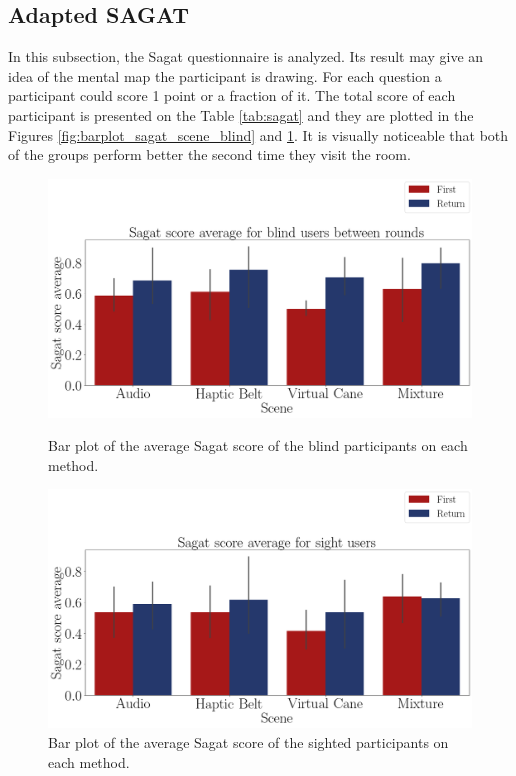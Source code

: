 \subsection{Adapted SAGAT}
\label{subsec:results_adapted_sagat}

In this subsection, the Sagat questionnaire is analyzed. Its result may give an idea of the mental map the participant is drawing. For each question a participant could score 1 point or a fraction of it. The total score of each participant is presented on the Table \ref{tab:sagat} and they are plotted in the Figures \ref{fig:barplot_sagat_scene_blind} and \ref{fig:barplot_sagat_scene_sight}. It is visually noticeable that both of the groups perform better the second time they visit the room.



\begin{figure}[!htb]
    \centering
    \begin{minipage}{\textwidth}
        \centering
        \includegraphics[width = 0.8\linewidth]{Resultados/Sagat/Figuras/png/barplot_sagat_avg_scene_blind.png}
        \caption{Bar plot of the average Sagat score of the blind participants on each method.}
        \label{fig:barplot_sagat_scene_blind}
    \end{minipage}
    \begin{minipage}{\textwidth}
        \centering
        \includegraphics[width = 0.8\linewidth]{Resultados/Sagat/Figuras/png/barplot_sagat_avg_scene_sight.png}
        \caption{Bar plot of the average Sagat score of the sighted participants on each method.}
        \label{fig:barplot_sagat_scene_sight}
    \end{minipage}
\end{figure}


